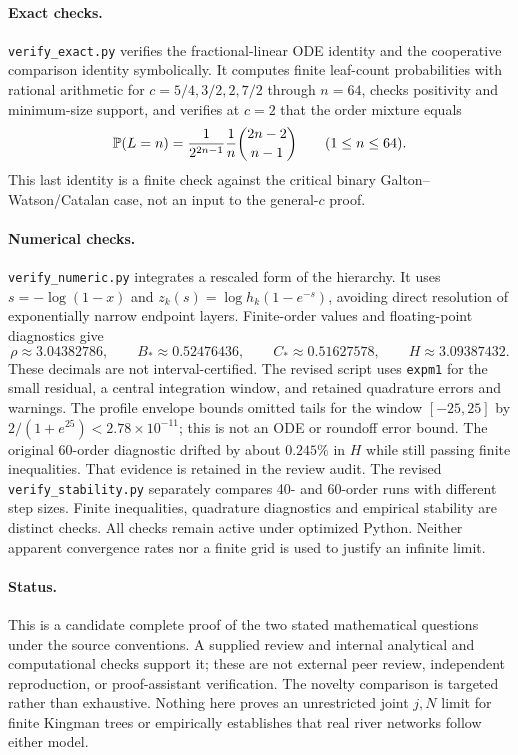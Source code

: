 \documentclass[11pt,a4paper]{article}
\theoremstyle{remark}\newtheorem{remark}[theorem]{Remark}
\begin{document}
\paragraph{Exact checks.}
\texttt{verify\_exact.py} verifies the fractional-linear ODE identity and the cooperative comparison identity symbolically. It computes finite leaf-count probabilities with rational arithmetic for $c=5/4,3/2,2,7/2$ through $n=64$, checks positivity and minimum-size support, and verifies at $c=2$ that the order mixture equals
\[
\mathbb P(L=n)=\frac{1}{2^{2n-1}}\frac1n\binom{2n-2}{n-1}
\qquad(1\le n\le64).
\]
This last identity is a finite check against the critical binary Galton--Watson/Catalan case, not an input to the general-$c$ proof.

\paragraph{Numerical checks.}
\texttt{verify\_numeric.py} integrates a rescaled form of the hierarchy. It uses $s=-\log(1-x)$ and $z_k(s)=\log h_k(1-e^{-s})$, avoiding direct resolution of exponentially narrow endpoint layers. Finite-order values and floating-point diagnostics give
\[
\rho\approx3.04382786,\qquad B_*\approx0.52476436,
\qquad C_*\approx0.51627578,\qquad H\approx3.09387432.
\]
These decimals are not interval-certified. The revised script uses \texttt{expm1} for the small residual, a central integration window, and retained quadrature errors and warnings. The profile envelope bounds omitted tails for the window $[-25,25]$ by $2/(1+e^{25})<2.78\times10^{-11}$; this is not an ODE or roundoff error bound. The original 60-order diagnostic drifted by about $0.245\%$ in $H$ while still passing finite inequalities. That evidence is retained in the review audit. The revised \texttt{verify\_stability.py} separately compares 40- and 60-order runs with different step sizes. Finite inequalities, quadrature diagnostics and empirical stability are distinct checks. All checks remain active under optimized Python. Neither apparent convergence rates nor a finite grid is used to justify an infinite limit.

\paragraph{Status.}
This is a candidate complete proof of the two stated mathematical questions under the source conventions. A supplied review and internal analytical and computational checks support it; these are not external peer review, independent reproduction, or proof-assistant verification. The novelty comparison is targeted rather than exhaustive. Nothing here proves an unrestricted joint $j,N$ limit for finite Kingman trees or empirically establishes that real river networks follow either model.
\end{document}
